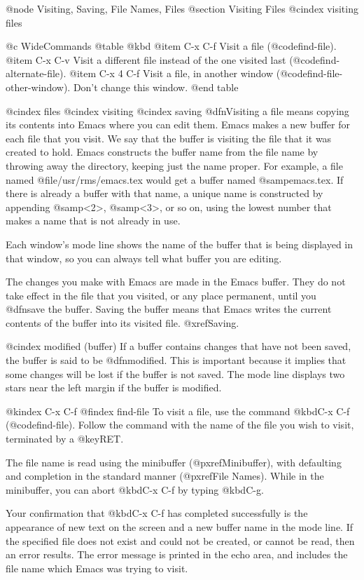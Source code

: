 {{{{{{{{{{{{{{{{{{{{@node Visiting, Saving, File Names, Files
@section Visiting Files
@cindex visiting files

@c WideCommands
@table @kbd
@item C-x C-f
Visit a file (@code{find-file}).
@item C-x C-v
Visit a different file instead of the one visited last
(@code{find-alternate-file}).
@item C-x 4 C-f
Visit a file, in another window (@code{find-file-other-window}).  Don't
change this window.
@end table

@cindex files
@cindex visiting
@cindex saving
  @dfn{Visiting} a file means copying its contents into Emacs where you can
edit them.  Emacs makes a new buffer for each file that you visit.  We say
that the buffer is visiting the file that it was created to hold.  Emacs
constructs the buffer name from the file name by throwing away the
directory, keeping just the name proper.  For example, a file named
@file{/usr/rms/emacs.tex} would get a buffer named @samp{emacs.tex}.  If
there is already a buffer with that name, a unique name is constructed by
appending @samp{<2>}, @samp{<3>}, or so on, using the lowest number that
makes a name that is not already in use.

  Each window's mode line shows the name of the buffer that is being displayed
in that window, so you can always tell what buffer you are editing.

  The changes you make with Emacs are made in the Emacs buffer.  They do
not take effect in the file that you visited, or any place permanent, until
you @dfn{save} the buffer.  Saving the buffer means that Emacs writes the
current contents of the buffer into its visited file.  @xref{Saving}.

@cindex modified (buffer)
  If a buffer contains changes that have not been saved, the buffer is said
to be @dfn{modified}.  This is important because it implies that some
changes will be lost if the buffer is not saved.  The mode line displays
two stars near the left margin if the buffer is modified.

@kindex C-x C-f
@findex find-file
  To visit a file, use the command @kbd{C-x C-f} (@code{find-file}).  Follow
the command with the name of the file you wish to visit, terminated by a
@key{RET}.

  The file name is read using the minibuffer (@pxref{Minibuffer}), with
defaulting and completion in the standard manner (@pxref{File Names}).
While in the minibuffer, you can abort @kbd{C-x C-f} by typing @kbd{C-g}.

  Your confirmation that @kbd{C-x C-f} has completed successfully is the
appearance of new text on the screen and a new buffer name in the mode
line.  If the specified file does not exist and could not be created, or
cannot be read, then an error results.  The error message is printed in the
echo area, and includes the file name which Emacs was trying to visit.

}}}}}}}}}}}}}}}}}}}}
